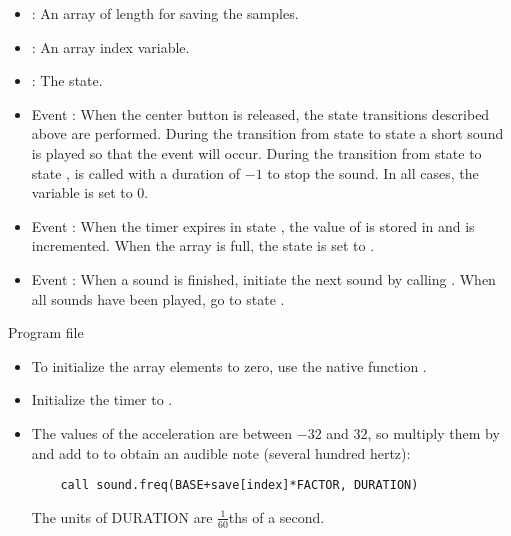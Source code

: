 
\begin{itemize}
\item {}: An array of length  for saving the samples.
\item {}: An array index variable.
\item {}: The state.
\end{itemize}


\begin{itemize}

\item Event : When the center button is released,
the state transitions described above are performed.
During the transition from state  to state  a short
sound is played so that the event  will occur.
During the transition from state  to state ,
 is called with a duration of $-1$ to stop the sound.
In all cases, the variable  is set to 0.

\item Event : When the timer expires in state ,
the value of  is stored in  and  is incremented.
When the array is full, the state is set to .

\item Event : When a sound is finished,
initiate the next sound by calling . When all sounds
have been played, go to state .
\end{itemize}


{\raggedleft \hfill Program file }

\begin{itemize}
\item To initialize the array elements to zero, use the native function .
\item Initialize the timer to .
\item The values of the acceleration are between $-32$ and $32$,
so multiply them by  and add to  to obtain
an audible note (several hundred hertz):
\begin{verbatim}
    call sound.freq(BASE+save[index]*FACTOR, DURATION)
\end{verbatim}
The units of DURATION are $\frac{1}{60}$ths of a second.
\end{itemize}

